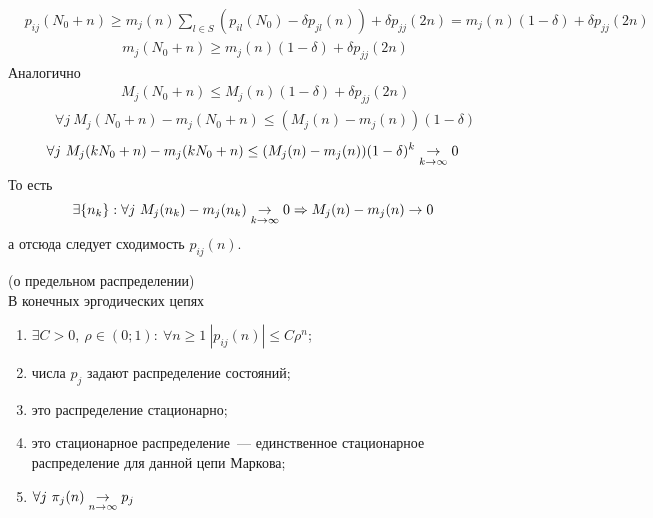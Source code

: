 \begin{Proof}
\begin{itemize}
\begin{align*}
          & p_{ij}(N_0+n) \geq m_j(n) \sum_{l \in S}\left( p_{il}(N_0) - \delta p_{jl}(n)\right) + \delta p_{jj}(2n) = m_j(n) (1-\delta) + \delta p_{jj}(2n)
        \end{align*}
        \begin{align*}
          & m_{j}(N_0+n) \geq m_j(n) (1-\delta) + \delta p_{jj}(2n)
        \end{align*}
        Аналогично
        \begin{align*}
          & M_{j}(N_0+n) \leq M_j(n) (1-\delta) + \delta p_{jj}(2n)
        \end{align*}
        \begin{align*}
          & \forall j \ M_{j}(N_0+n) - m_j(N_0+n) \leq (M_j(n)-m_j(n)) (1-\delta) 
        \end{align*}
        \begin{align*}
          & \forall j \ M_{j}(kN_0+n) - m_j(kN_0+n) \leq (M_j(n)-m_j(n)) (1-\delta)^k \underset{k\to \infty}\rightarrow 0
        \end{align*}
        То есть
        \begin{align*}
          & \exists \{n_k\}: \forall j \ M_{j}(n_k) - m_j(n_k) \underset{k\to \infty}\rightarrow 0 \Rightarrow M_j(n) - m_j(n) \to 0
        \end{align*}
        а отсюда следует сходимость $p_{ij}(n)$.
    \end{itemize}
\end{Proof}
\begin{theorem} (о предельном распределении)
    \\
    В конечных эргодических цепях
    \begin{enumerate}
        \item $\exists C > 0, \ \rho \in (0;1): \ \forall n \geq 1 \ \left| p_{ij}(n) \right| \leq
        C\rho^n$;
        \item числа $p_{j}$ задают распределение состояний;
        \item это распределение стационарно;
        \item это стационарное распределение~--- единственное стационарное
        распределение для данной цепи Маркова;
        \item $\forall j \ \pi_{j}(n) \underset{n \to \infty}\rightarrow p_j$
    \end{enumerate}
\end{theorem}
